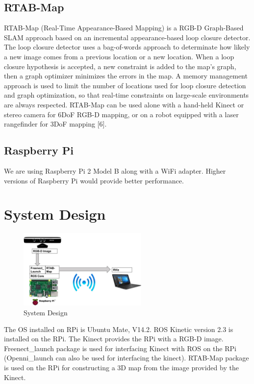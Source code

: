 \documentclass[journal]{IEEEtran}
\begin{document}
\subsection{RTAB-Map}
RTAB-Map (Real-Time Appearance-Based Mapping) is a RGB-D Graph-Based SLAM approach based on an incremental appearance-based loop closure detector. The loop closure detector uses a bag-of-words approach to determinate how likely a new image comes from a previous location or a new location. When a loop closure hypothesis is accepted, a new constraint is added to the map’s graph, then a graph optimizer minimizes the errors in the map. A memory management approach is used to limit the number of locations used for loop closure detection and graph optimization, so that real-time constraints on large-scale environments are always respected. RTAB-Map can be used alone with a hand-held Kinect or stereo camera for 6DoF RGB-D mapping, or on a robot equipped with a laser rangefinder for 3DoF mapping [6].

\subsection{Raspberry Pi}
We are using Raspberry Pi 2 Model B along with a WiFi adapter. Higher versions of Raspberry Pi would provide better performance.

\section{System Design}
\begin{figure}[ht]
	\centering
	\includegraphics[width=2.5in]{SystemDesign.jpg}
	\caption{System Design}
	\label{fig_sim}
\end{figure}

The OS installed on RPi is Ubuntu Mate, V14.2. ROS Kinetic version 2.3 is installed on the RPi. The Kinect provides the RPi with a RGB-D image. Freenect\_launch package is used for interfacing Kinect with ROS on the RPi (Openni\_launch can also be used for interfacing the kinect). RTAB-Map package is used on the RPi for constructing a 3D map from the image provided by the Kinect.
\end{document}
